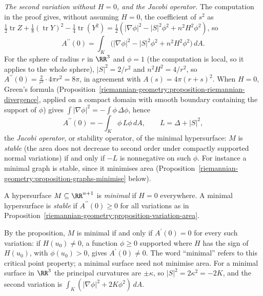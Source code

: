 \begin{remark}\label{riemannian-geometry:remark-second-variation-general}
\emph{The second variation without $H = 0$, and the Jacobi operator.} The computation in the proof gives, without assuming $H = 0$, the coefficient of $s^2$ as
$\frac12\operatorname{tr}Z + \frac18(\operatorname{tr}Y)^2 - \frac14\operatorname{tr}(Y^2) = \frac12(|\nabla\phi|^2 - |S|^2\phi^2 + n^2H^2\phi^2)$, so
\[
A^{\prime\prime}(0) = \int_K\bigl(|\nabla\phi|^2 - |S|^2\phi^2 + n^2H^2\phi^2\bigr)\,dA .
\]
For the sphere of radius $r$ in $\RR^3$ and $\phi = 1$ (the computation is local, so it applies to the whole sphere), $|S|^2 = 2/r^2$ and $n^2H^2 = 4/r^2$, so $A^{\prime\prime}(0) = \frac{2}{r^2} \cdot 4\pi r^2 = 8\pi$,
in agreement with $A(s) = 4\pi(r + s)^2$. When $H = 0$, Green's formula (Proposition~\ref{riemannian-geometry:proposition-riemannian-divergence}, applied on a compact domain with smooth boundary
containing the support of $\phi$) gives $\int|\nabla\phi|^2 = -\int\phi\,\Delta\phi$, hence
\[
A^{\prime\prime}(0) = -\int_K\phi\,L\phi\,dA, \qquad L = \Delta + |S|^2,
\]
the \emph{Jacobi operator}, or stability operator, of the minimal hypersurface: $M$ is \emph{stable} (the area does not decrease to second order under compactly supported normal variations) if and only if
$-L$ is nonnegative on such $\phi$. For instance a minimal graph is stable, since it minimises area (Proposition~\ref{riemannian-geometry:proposition-graphs-minimise} below).
\end{remark}

\begin{definition}\label{riemannian-geometry:definition-minimal}
A hypersurface $M \subseteq \RR^{n+1}$ is \emph{minimal} if $H = 0$ everywhere. A minimal hypersurface is \emph{stable} if $A^{\prime\prime}(0) \geq 0$ for all variations as in
Proposition~\ref{riemannian-geometry:proposition-variation-area}.
\end{definition}

By the proposition, $M$ is minimal if and only if $A^{\prime}(0) = 0$ for every such variation: if $H(u_0) \neq 0$, a function $\phi \geq 0$ supported where $H$ has the sign of
$H(u_0)$, with $\phi(u_0) > 0$, gives $A^{\prime}(0) \neq 0$. The word ``minimal'' refers to this critical point property; a minimal surface need not minimise area. For a
minimal surface in $\RR^3$ the principal curvatures are $\pm\kappa$, so $|S|^2 = 2\kappa^2 = -2K$, and the second variation is $\int_K(|\nabla\phi|^2 + 2K\phi^2)\,dA$.

